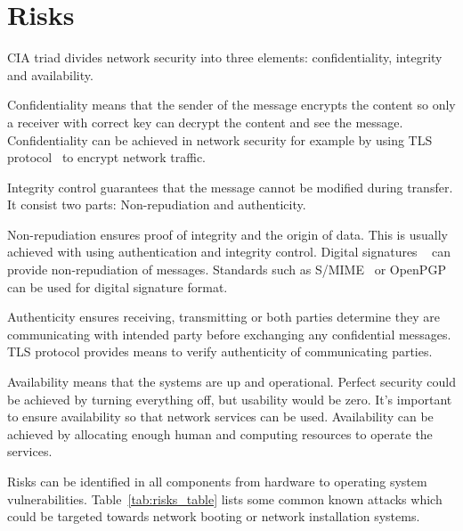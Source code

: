 \section{Risks}

CIA triad divides network security into three elements:
confidentiality, integrity and availability.

Confidentiality means that the sender of the message encrypts the
content so only a receiver with correct key can decrypt the content
and see the message. Confidentiality can be achieved in network
security for example by using TLS protocol~\cite{RFC5246} to encrypt
network traffic.

Integrity control guarantees that the message cannot be modified
during transfer. It consist two parts: Non-repudiation and
authenticity.

Non-repudiation ensures proof of integrity and the origin of
data. This is usually achieved with using authentication and integrity
control. Digital signatures
~\cite{Diffie:2006:NDC:2263321.2269104}\cite{Goldwasser:1988:DSS:45474.45480}
can provide non-repudiation of messages. Standards such as
S/MIME~\cite{RFC5751} or OpenPGP~\cite{RFC4880} can be used for
digital signature format.

Authenticity ensures receiving, transmitting or both parties determine
they are communicating with intended party before exchanging any
confidential messages. TLS protocol provides means to verify
authenticity of communicating parties.

Availability means that the systems are up and operational. Perfect
security could be achieved by turning everything off, but usability
would be zero. It's important to ensure availability so that network
services can be used. Availability can be achieved by allocating
enough human and computing resources to operate the services.

Risks can be identified in all components from hardware to operating
system vulnerabilities. Table~\ref{tab:risks_table} lists some
common known attacks which could be targeted towards network booting
or network installation systems.

